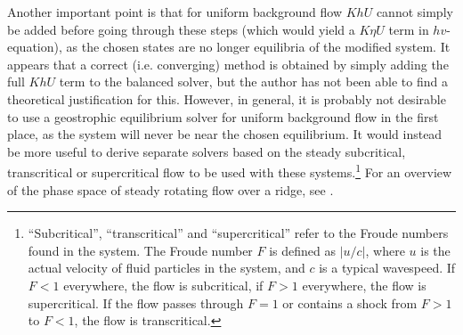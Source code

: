 Another important point is that for uniform background flow $KhU$ cannot simply be added before going through these steps (which would yield a $K\eta U$ term in $hv$-equation), as the chosen states are no longer equilibria of the modified system. It appears that a correct (i.e. converging) method is obtained by simply adding the full $KhU$ term to the balanced solver, but the author has not been able to find a theoretical justification for this. However, in general, it is probably not desirable to use a geostrophic equilibrium solver for uniform background flow in the first place, as the system will never be near the chosen equilibrium. It would instead be more useful to derive separate solvers based on the steady subcritical, transcritical or supercritical flow to be used with these systems.\footnote{``Subcritical'', ``transcritical'' and ``supercritical'' refer to the Froude numbers found in the system. The Froude number $F$ is defined as $|u/c|$, where $u$ is the actual velocity of fluid particles in the system, and $c$ is a typical wavespeed. If $F < 1$ everywhere, the flow is subcritical, if $F > 1$ everywhere, the flow is supercritical. If the flow passes through $F = 1$ or contains a shock from $F > 1$ to $F < 1$, the flow is transcritical.} For an overview of the phase space of steady rotating flow over a ridge, see \cite{esler2005steady}.